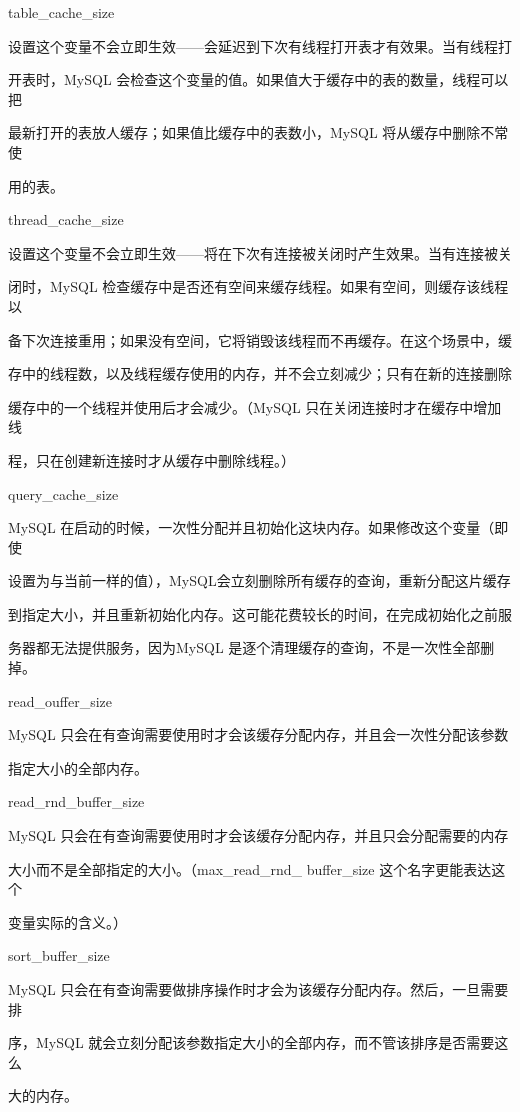 table\_cache\_size

设置这个变量不会立即生效——会延迟到下次有线程打开表才有效果。当有线程打

开表时，MySQL 会检查这个变量的值。如果值大于缓存中的表的数量，线程可以把

最新打开的表放人缓存；如果值比缓存中的表数小，MySQL 将从缓存中删除不常使

用的表。

thread\_cache\_size

设置这个变量不会立即生效——将在下次有连接被关闭时产生效果。当有连接被关

闭时，MySQL 检查缓存中是否还有空间来缓存线程。如果有空间，则缓存该线程以

备下次连接重用；如果没有空间，它将销毁该线程而不再缓存。在这个场景中，缓

存中的线程数，以及线程缓存使用的内存，并不会立刻减少；只有在新的连接删除

缓存中的一个线程并使用后才会减少。（MySQL 只在关闭连接时才在缓存中增加线

程，只在创建新连接时才从缓存中删除线程。）

query\_cache\_size

MySQL 在启动的时候，一次性分配并且初始化这块内存。如果修改这个变量（即使

设置为与当前一样的值），MySQL会立刻删除所有缓存的查询，重新分配这片缓存

到指定大小，并且重新初始化内存。这可能花费较长的时间，在完成初始化之前服

务器都无法提供服务，因为MySQL 是逐个清理缓存的查询，不是一次性全部删掉。

read\_ouffer\_size

MySQL 只会在有查询需要使用时才会该缓存分配内存，并且会一次性分配该参数

指定大小的全部内存。

read\_rnd\_buffer\_size

MySQL 只会在有查询需要使用时才会该缓存分配内存，并且只会分配需要的内存

大小而不是全部指定的大小。（max\_read\_rnd\_ buffer\_size 这个名字更能表达这个

变量实际的含义。）

sort\_buffer\_size

MySQL 只会在有查询需要做排序操作时才会为该缓存分配内存。然后，一旦需要排

序，MySQL 就会立刻分配该参数指定大小的全部内存，而不管该排序是否需要这么

大的内存。

